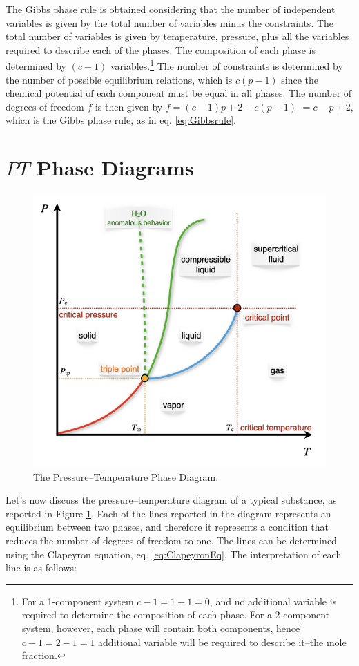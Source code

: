 \documentclass[
  9pt,
]{extbook}
\theoremstyle{definition}
\theoremstyle{definition}
\theoremstyle{definition}
\theoremstyle{remark}
\begin{document}
The Gibbs phase rule is obtained considering that the number of independent variables is given by the total number of variables minus the constraints. The total number of variables is given by temperature, pressure, plus all the variables required to describe each of the phases. The composition of each phase is determined by \((c-1)\) variables.\footnote{For a 1-component system \(c-1=1-1=0\), and no additional variable is required to determine the composition of each phase. For a 2-component system, however, each phase will contain both components, hence \(c-1=2-1=1\) additional variable will be required to describe it--the mole fraction.} The number of constraints is determined by the number of possible equilibrium relations, which is \(c(p-1)\) since the chemical potential of each component must be equal in all phases. The number of degrees of freedom \(f\) is then given by \(f=(c-1)p+2-c(p-1)\) \(=c-p+2\), which is the Gibbs phase rule, as in eq. \eqref{eq:Gibbsrule}.

\hypertarget{pt-phase-diagrams}{%
\section{\texorpdfstring{\(PT\) Phase Diagrams}{PT Phase Diagrams}}\label{pt-phase-diagrams}}

\begin{figure}

{\centering \includegraphics[width=0.6\linewidth]{./img/OEP_Figures.018} 

}

\caption{The Pressure–Temperature Phase Diagram.}\label{fig:FigPhase3}
\end{figure}

Let's now discuss the pressure--temperature diagram of a typical substance, as reported in Figure \ref{fig:FigPhase3}. Each of the lines reported in the diagram represents an equilibrium between two phases, and therefore it represents a condition that reduces the number of degrees of freedom to one. The lines can be determined using the Clapeyron equation, eq. \eqref{eq:ClapeyronEq}. The interpretation of each line is as follows:
\end{document}
